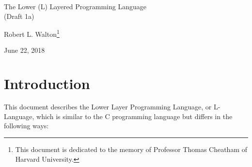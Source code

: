 \documentclass[12pt]{article}
\makeatletter
\renewcommand\tableofcontents{%
    \begin{list}{}%
	     {\setlength{\itemsep}{0in}%
	      \setlength{\topsep}{0in}%
	      \setlength{\parsep}{1ex}%
	      \setlength{\labelwidth}{0in}%
	      \setlength{\baselineskip}{1.5ex}%
	      \setlength{\leftmargin}{1.0in}%
	      \setlength{\rightmargin}{1.0in}}%
    \item\@starttoc{toc}%
    \end{list}}
\makeatother
\begin{document}
        
\begin{center}

{\Large
The Lower (L) Layered Programming Language \\[0.5ex]
(Draft 1a)}

\medskip

Robert L. Walton\footnote{This document is dedicated to the memory
of Professor Thomas Cheatham of Harvard University.}

June 22, 2018
 
\end{center}

{\small \tableofcontents}

\newpage

\section{Introduction}

This document describes the Lower Layer Programming Language, or
L-Language, which is similar to the C programming language
but differs in the following ways:
\end{document}
